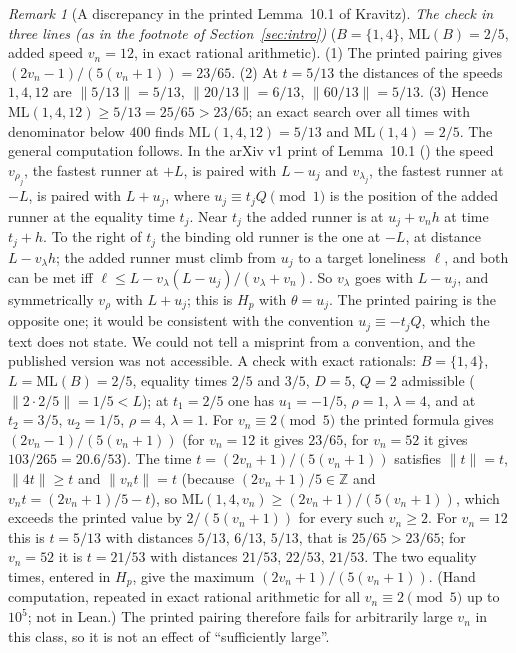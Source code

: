\documentclass[11pt]{article}
\theoremstyle{definition}
\theoremstyle{remark}
\newtheorem{remark}[theorem]{Remark}
\newcommand{\nd}[1]{\lVert #1\rVert}
\newcommand{\ML}{\mathrm{ML}}
\newcommand{\ZZ}{\mathbb{Z}}
\begin{document}
\begin{remark}[A discrepancy in the printed Lemma~10.1 of Kravitz]
\smallskip\noindent\emph{The check in three lines (as in the footnote of Section~\ref{sec:intro})} ($B=\{1,4\}$, $\ML(B)=2/5$, added speed $v_n=12$, in exact rational arithmetic). (1) The printed pairing gives $(2v_n-1)/(5(v_n+1))=23/65$. (2) At $t=5/13$ the distances of the speeds $1,4,12$ are $\nd{5/13}=5/13$, $\nd{20/13}=6/13$, $\nd{60/13}=5/13$. (3) Hence $\ML(1,4,12)\ge5/13=25/65>23/65$; an exact search over all times with denominator below $400$ finds $\ML(1,4,12)=5/13$ and $\ML(1,4)=2/5$. The general computation follows.
\smallskip
In the arXiv v1 print of Lemma~10.1 (\cite[p.~19]{K}) the speed $v_{\rho_j}$, the fastest runner at $+L$, is paired with $L-u_j$ and $v_{\lambda_j}$, the fastest runner at $-L$, is paired with $L+u_j$, where $u_j\equiv t_jQ\pmod1$ is the position of the added runner at the equality time $t_j$. Near $t_j$ the added runner is at $u_j+v_nh$ at time $t_j+h$. To the right of $t_j$ the binding old runner is the one at $-L$, at distance $L-v_\lambda h$; the added runner must climb from $u_j$ to a target loneliness $\ell$, and both can be met iff $\ell\le L-v_\lambda(L-u_j)/(v_\lambda+v_n)$. So $v_\lambda$ goes with $L-u_j$, and symmetrically $v_\rho$ with $L+u_j$; this is $H_p$ with $\theta=u_j$. The printed pairing is the opposite one; it would be consistent with the convention $u_j\equiv-t_jQ$, which the text does not state. We could not tell a misprint from a convention, and the published version was not accessible. A check with exact rationals: $B=\{1,4\}$, $L=\ML(B)=2/5$, equality times $2/5$ and $3/5$, $D=5$, $Q=2$ admissible ($\nd{2\cdot2/5}=1/5<L$); at $t_1=2/5$ one has $u_1=-1/5$, $\rho=1$, $\lambda=4$, and at $t_2=3/5$, $u_2=1/5$, $\rho=4$, $\lambda=1$. For $v_n\equiv2\pmod5$ the printed formula gives $(2v_n-1)/(5(v_n+1))$ (for $v_n=12$ it gives $23/65$, for $v_n=52$ it gives $103/265=20.6/53$). The time $t=(2v_n+1)/(5(v_n+1))$ satisfies $\nd{t}=t$, $\nd{4t}\ge t$ and $\nd{v_nt}=t$ (because $(2v_n+1)/5\in\ZZ$ and $v_nt=(2v_n+1)/5-t$), so $\ML(1,4,v_n)\ge(2v_n+1)/(5(v_n+1))$, which exceeds the printed value by $2/(5(v_n+1))$ for every such $v_n\ge2$. For $v_n=12$ this is $t=5/13$ with distances $5/13$, $6/13$, $5/13$, that is $25/65>23/65$; for $v_n=52$ it is $t=21/53$ with distances $21/53$, $22/53$, $21/53$. The two equality times, entered in $H_p$, give the maximum $(2v_n+1)/(5(v_n+1))$. (Hand computation, repeated in exact rational arithmetic for all $v_n\equiv2\pmod5$ up to $10^5$; not in Lean.) The printed pairing therefore fails for arbitrarily large $v_n$ in this class, so it is not an effect of ``sufficiently large''.
\end{remark}
\end{document}

